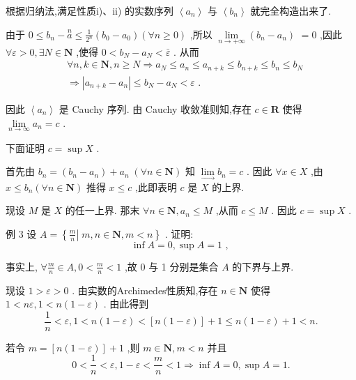 根据归纳法,满足性质i)、ii) 的实数序列 $\left\langle  {a}_{n}\right\rangle$ 与 $\left\langle  {b}_{n}\right\rangle$ 就完全构造出来了.

由于 $0 \leq  {b}_{n} - \overset{n}{a} \leq  \frac{1}{{2}^{n}}\left( {{b}_{0} - {a}_{0}}\right) \left( {\forall n \geq  0}\right)$ ,所以 $\mathop{\lim }\limits_{{n \rightarrow   + \infty }}\left( {{b}_{n} - {a}_{n}}\right)$  $= 0$ ,因此 $\forall \varepsilon  > 0,\exists N \in  \mathbf{N}$ ,使得 $0 < {b}_{N} - {a}_{N} < \bar{\varepsilon }$ . 从而
\begin{align*}
	&\forall n,k \in  \mathbf{N},n \geq  N \Rightarrow  {a}_{N} \leq  {a}_{n} \leq  {a}_{n + k} \leq  {b}_{n + k} \leq  {b}_{n} \leq  {b}_{N}\\
	&\Rightarrow  \left| {{a}_{n + k} - {a}_{n}}\right|  \leq  {b}_{N} - {a}_{N} < \varepsilon \text{ . }
\end{align*}

因此 $\left\langle  {a}_{n}\right\rangle$ 是 Cauchy 序列. 由 Cauchy 收敛准则知,存在 $c \in  \mathbf{R}$ 使得 $\mathop{\lim }\limits_{{n \rightarrow  \infty }}{a}_{n} = c$ .

下面证明 $c = \sup X$ .

首先由 ${b}_{n} = \left( {{b}_{n} - {a}_{n}}\right)  + {a}_{n}\;\left( {\forall n \in  \mathbf{N}}\right)$ 知 $\mathop{\lim }\limits_{ \rightarrow  }{b}_{n} = c$ . 因此 $\forall x \in  X$ ,由 $x \leq  {b}_{n}\left( {\forall n \in  \mathbf{N}}\right)$ 推得 $x \leq  c$ ,此即表明 $c$ 是 $X$ 的上界.

现设 $M$ 是 $X$ 的任一上界. 那末 $\forall n \in  \mathbf{N},{a}_{n} \leq  M$ ,从而 $c \leq  M$ . 因此 $c = \sup X$ .

例 3 设 $A = \left\{  {\left. \frac{m}{n}\right| \;m,n \in  \mathbf{N},m < n}\right\}$ . 证明:
$$\inf A = 0,\sup A = 1\text{ , }$$

事实上, $\forall \frac{m}{n} \in  A,0 < \frac{m}{n} < 1$ ,故 0 与 1 分别是集合 $A$ 的下界与上界.

现设 $1 > \varepsilon  > 0$ . 由实数的Archimedes性质知,存在 $n \in  \mathbf{N}$ 使得 $1 < {n\varepsilon },1 < n\left( {1 - \varepsilon }\right)$ . 由此得到
$$\frac{1}{n} < \varepsilon ,1 < n\left( {1 - \varepsilon }\right)  < \left\lbrack  {n\left( {1 - \varepsilon }\right) }\right\rbrack   + 1 \leq  n\left( {1 - \varepsilon }\right)  + 1 < n.$$

若令 $m = \left\lbrack  {n\left( {1 - \varepsilon }\right) }\right\rbrack   + 1$ ,则 $m \in  \mathbf{N},m < n$ 并且
$$0 < \frac{1}{n} < \varepsilon ,1 - \varepsilon  < \frac{m}{n} < 1 \Rightarrow  \inf A = 0,\sup A = 1.$$

